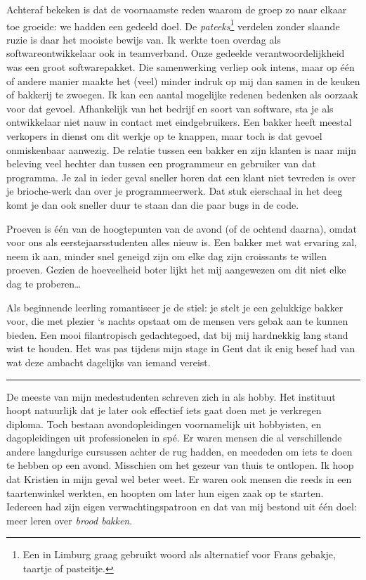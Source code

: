 \documentclass[
  11pt,
  dutch,
]{memoir}
\begin{document}
Achteraf bekeken is dat de voornaamste reden waarom de groep zo naar
elkaar toe groeide: we hadden een gedeeld doel. De
\emph{pateeks}\footnote{Een in Limburg graag gebruikt woord als
  alternatief voor Frans gebakje, taartje of pasteitje.} verdelen zonder
slaande ruzie is daar het mooiste bewijs van. Ik werkte toen overdag als
softwareontwikkelaar ook in teamverband. Onze gedeelde
verantwoordelijkheid was een groot softwarepakket. Die samenwerking
verliep ook intens, maar op één of andere manier maakte het (veel)
minder indruk op mij dan samen in de keuken of bakkerij te zwoegen. Ik
kan een aantal mogelijke redenen bedenken als oorzaak voor dat gevoel.
Afhankelijk van het bedrijf en soort van software, sta je als
ontwikkelaar niet nauw in contact met eindgebruikers. Een bakker heeft
meestal verkopers in dienst om dit werkje op te knappen, maar toch is
dat gevoel onmiskenbaar aanwezig. De relatie tussen een bakker en zijn
klanten is naar mijn beleving veel hechter dan tussen een programmeur en
gebruiker van dat programma. Je zal in ieder geval sneller horen dat een
klant niet tevreden is over je brioche-werk dan over je programmeerwerk.
Dat stuk eierschaal in het deeg komt je dan ook sneller duur te staan
dan die paar bugs in de code.

Proeven is één van de hoogtepunten van de avond (of de ochtend daarna),
omdat voor ons als eerstejaarsstudenten alles nieuw is. Een bakker met
wat ervaring zal, neem ik aan, minder snel geneigd zijn om elke dag zijn
croissants te willen proeven. Gezien de hoeveelheid boter lijkt het mij
aangewezen om dit niet elke dag te proberen\ldots{}

Als beginnende leerling romantiseer je de stiel: je stelt je een
gelukkige bakker voor, die met plezier `s nachts opstaat om de mensen
vers gebak aan te kunnen bieden. Een mooi filantropisch gedachtegoed,
dat bij mij hardnekkig lang stand wist te houden. Het was pas tijdens
mijn stage in Gent dat ik enig besef had van wat deze ambacht dagelijks
van iemand vereist.

\pfbreak

De meeste van mijn medestudenten schreven zich in als hobby. Het
instituut hoopt natuurlijk dat je later ook effectief iets gaat doen met
je verkregen diploma. Toch bestaan avondopleidingen voornamelijk uit
hobbyisten, en dagopleidingen uit professionelen in spé. Er waren mensen
die al verschillende andere langdurige cursussen achter de rug hadden,
en meededen om iets te doen te hebben op een avond. Misschien om het
gezeur van thuis te ontlopen. Ik hoop dat Kristien in mijn geval wel
beter weet. Er waren ook mensen die reeds in een taartenwinkel werkten,
en hoopten om later hun eigen zaak op te starten. Iedereen had zijn
eigen verwachtingspatroon en dat van mij bestond uit één doel: meer
leren over \emph{brood bakken}.
\end{document}
